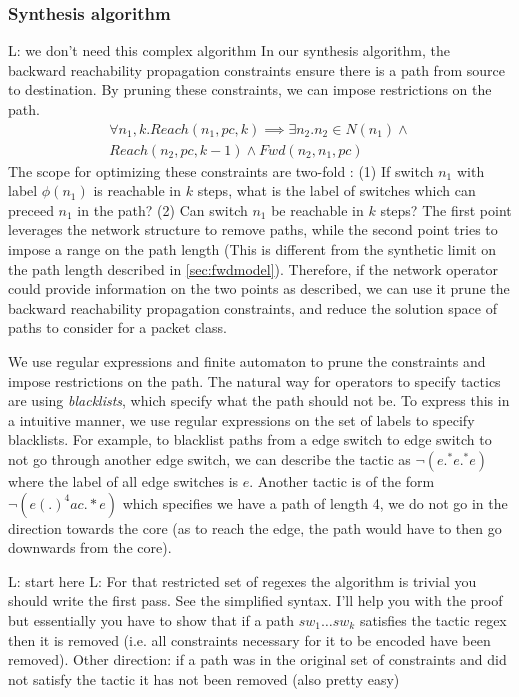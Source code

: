 \documentclass[]{sig}
\newcommand{\loris}[1]{\textcolor[rgb]{0.00,0.00,1.00}{L: #1}}
\begin{document}
\subsubsection{Synthesis algorithm}
\loris{we don't need this complex algorithm}
In our synthesis algorithm, the backward reachability propagation constraints ensure there is a path from source to destination. By pruning these constraints, we can impose restrictions on the path. 
\begin{multline}
\forall n_1,k.  Reach(n_1,pc,k) \implies \exists n_2.  n_2 \in N(n_1) \wedge \\ Reach(n_2,pc,k-1) \wedge Fwd(n_2,n_1,pc)
\end{multline} 
The scope for optimizing these constraints are two-fold : (1) If switch $n_1$ with label $\phi(n_1)$ is reachable in $k$ steps, what is the label of switches which can preceed $n_1$ in the path? (2) Can switch $n_1$ be reachable in $k$ steps? The first point leverages the network structure to remove paths, while the second point tries to impose a range on the path length (This is different from the synthetic limit on the path length described in \cref{sec:fwdmodel}). Therefore, if the network operator could provide information on the two points as described, we can use it prune the backward reachability propagation constraints, and reduce the solution space of paths to consider for a packet class. 

We use regular expressions and finite automaton to prune the constraints and impose restrictions on the path. The natural way for operators to specify tactics are using \emph{blacklists}, which specify what the path should not be. To express this in a intuitive manner, we use regular expressions on the set of labels to specify blacklists. For example, to blacklist paths from a edge switch to edge switch to not go through another edge switch, we can describe the tactic as $\neg (e .^* e .^* e)$ where the label of all edge switches is $e$. Another tactic is of the form $\neg (e (.)^4 a c .* e)$ which specifies we have a path of length 4, we do not go in the direction towards the core (as to reach the edge, the path would have to then go downwards from the core). 

\loris{start here}
\loris{For that restricted set of regexes the algorithm is trivial you should write the first pass. 
See the simplified syntax.
I'll help you with the proof but essentially you have to show that
if a path $sw_1\ldots sw_k$ satisfies the tactic regex then it is removed (i.e. all constraints necessary
for it to be encoded have been removed).
Other direction: if a path was in the original set of constraints and did not 
satisfy the tactic it has not been removed (also pretty easy)
}
\end{document}
